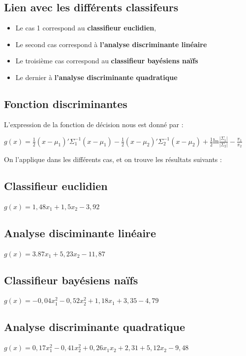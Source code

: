 \documentclass[a4paper,11pt]{article}
\begin{document}
\subsection{Lien avec les différents classifeurs}

\begin{itemize}
\item Le cas 1 correspond au \textbf{classifieur euclidien}, \\
\item Le second cas correspond à \textbf{l'analyse discriminante linéaire}\\
\item Le troisième cas correspond au \textbf{classifieur bayésiens naïfs}\\
\item Le dernier à \textbf{l'analyse discriminante quadratique}\\
\end{itemize}

\subsection{Fonction discriminantes}

\noindent L'expression de la fonction de décision nous est donné par : 

\begin{center}
$g(x) = \frac{1}{2}(x-\mu_1)' \Sigma_1^{-1}(x-\mu_1) - \frac{1}{2}(x-\mu_2)'\Sigma_2^{-1}(x-\mu_2) + \frac{1}{2}$ln$\frac{|\Sigma_1|}{|\Sigma_2|} - \frac{\pi_1}{\pi_2}$
\end{center}

\noindent On l'applique dans les différents cas, et on trouve les résultats suivants : 

\subsection{Classifieur euclidien}

\noindent $g(x) = 1,48 x_1 + 1,5 x_2 - 3,92$

\subsection{Analyse disciminante linéaire}

\noindent $g(x) = 3.87x_1 + 5,23x_2 - 11,87$

\subsection{Classifieur bayésiens naïfs}

\noindent $g(x) = -0,04x_1^2 -0,52x_2^2 + 1,18x_1 + 3,35 - 4,79$

\subsection{Analyse discriminante quadratique}

\noindent $g(x) = 0,17 x_1^2 - 0,41 x_2^2 + 0,26x_1x_2 + 2,31 + 5,12x_2 - 9,48$ 
\end{document}
